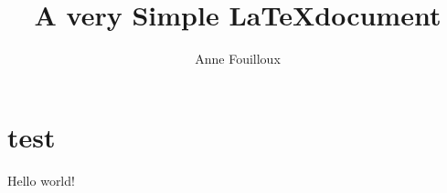 \documentclass{article}
\begin{document}
\title{A very Simple \LaTeX document}
\date{}
\author{Anne Fouilloux}
\maketitle


\section{test}

Hello world!
\end{document}
